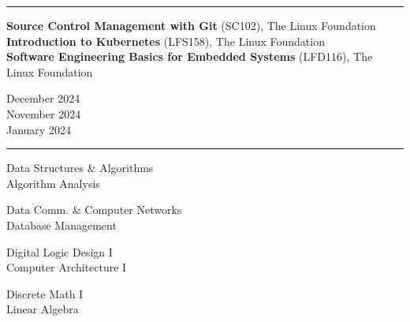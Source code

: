 \documentclass[letter]{article}
\begin{document}
    \vspace{4pt}
    \hrule height 1pt
    \vspace{4pt}
    \noindent
    \begin{minipage}[c]{0.7\linewidth}
        \noindent \textbf{Source Control Management with Git} (SC102), The Linux Foundation \\
        \noindent \textbf{Introduction to Kubernetes} (LFS158), The Linux Foundation \\
        \noindent \textbf{Software Engineering Basics for Embedded Systems} (LFD116), The Linux Foundation \\
    \end{minipage}
    \begin{minipage}[c]{0.295\linewidth}
        \vspace*{-\baselineskip}
        \begin{flushright}
            December 2024 \\
            November 2024 \\
            January 2024 \\
        \end{flushright}
    \end{minipage}

    \vspace{4pt}
    \hrule height 1pt
    \vspace{4pt}
    \noindent
    \begin{minipage}[c]{0.29\linewidth}
        \noindent Data Structures \& Algorithms \\
        \noindent Algorithm Analysis \\
    \end{minipage}
    \begin{minipage}[c]{0.29\linewidth}
        \noindent Data Comm. \& Computer Networks \\
        \noindent Database Management \\
    \end{minipage}
    \begin{minipage}[c]{0.29\linewidth}
        \noindent Digital Logic Design I \\
        \noindent Computer Architecture I \\
    \end{minipage}
        \begin{minipage}[c]{0.29\linewidth}
        \noindent Discrete Math I \\
        \noindent Linear Algebra \\
    \end{minipage}
\end{document}
